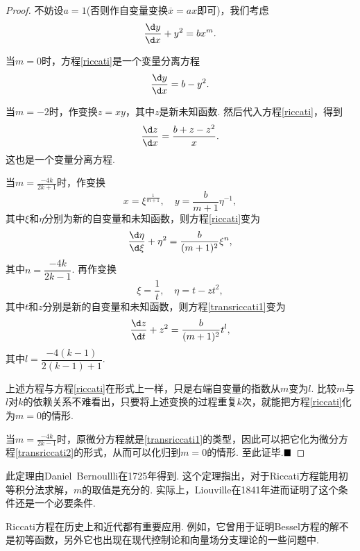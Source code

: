 \documentclass[lang=cn,10pt]{elegantbook}
\begin{document}
\begin{proof}
	不妨设$a=1$(否则作自变量变换$\overline{x}=ax$即可)，我们考虑
	\begin{equation}\label{riccati}
		\frac{\d y}{\d x}+y^2=bx^m.
	\end{equation}
	
	当$m=0$时，方程\ref{riccati}是一个变量分离方程
	$$\frac{\d y}{\d x}=b-y^2.$$
	
	当$m=-2$时，作变换$z=xy$，其中$z$是新未知函数. 然后代入方程\ref{riccati}，得到
	$$\frac{\d z}{\d x}=\frac{b+z-z^2}{x}.$$
	这也是一个变量分离方程.
	
	\hspace*{\fill}
	
	当$m=\displaystyle\frac{-4k}{2k+1}$时，作变换
	$$x=\xi^{\frac{1}{m+1}},\quad y=\frac{b}{m+1}\eta^{-1},$$
	其中$\xi$和$\eta$分别为新的自变量和未知函数，则方程\ref{riccati}变为
	\begin{equation}\label{transriccati1}
		\frac{\d \eta}{\d \xi}+\eta^2=\frac{b}{(m+1)^2}\xi^n,
	\end{equation}
	其中$n=\dfrac{-4k}{2k-1}$. 再作变换
	$$\xi=\frac{1}{t},\quad \eta=t-zt^2,$$
	其中$t$和$z$分别是新的自变量和未知函数，则方程\ref{transriccati1}变为
	\begin{equation}\label{transriccati2}
		\frac{\d z}{\d t}+z^2=\frac{b}{(m+1)^2}t^l,
	\end{equation}
	其中$l=\dfrac{-4(k-1)}{2(k-1)+1}$.
	
	\hspace*{\fill}
	
	上述方程与方程\ref{riccati}在形式上一样，只是右端自变量的指数从$m$变为$l$. 比较$m$与$l$对$k$的依赖关系不难看出，只要将上述变换的过程重复$k$次，就能把方程\ref{riccati}化为$m=0$的情形.
	
	\hspace*{\fill}
	
	当$m=\displaystyle\frac{-4k}{2k-1}$时，原微分方程就是\ref{transriccati1}的类型，因此可以把它化为微分方程\ref{transriccati2}的形式，从而可以化归到$m=0$的情形. 至此证毕.$\hfill\blacksquare$
\end{proof}
\begin{remark}
	此定理由Daniel\ Bernoullli在1725年得到. 这个定理指出，对于Riccati方程能用初等积分法求解，$m$的取值是充分的. 实际上，Liouville在1841年进而证明了这个条件还是一个必要条件.
\end{remark}
\begin{remark}
	Riccati方程在历史上和近代都有重要应用. 例如，它曾用于证明Bessel方程的解不是初等函数，另外它也出现在现代控制论和向量场分支理论的一些问题中.
\end{remark}
\end{document}
